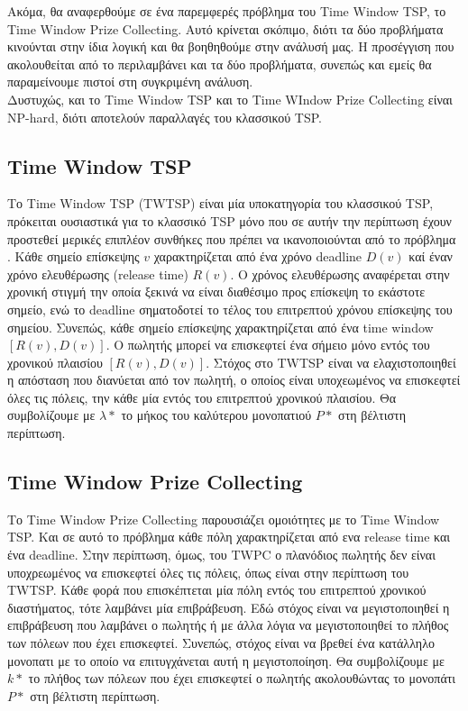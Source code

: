 \documentclass[oneside,12pt]{book}
\theoremstyle{definition}
\begin{document}
Ακόμα, θα αναφερθούμε σε ένα παρεμφερές πρόβλημα του Time Window TSP, το Time Window Prize Collecting. Αυτό κρίνεται σκόπιμο, διότι τα δύο προβλήματα κινούνται στην ίδια λογική και θα βοηθηθούμε στην ανάλυσή μας. Η προσέγγιση που ακολουθείται από το \cite{12} περιλαμβάνει και τα δύο προβλήματα, συνεπώς και εμείς θα παραμείνουμε πιστοί στη συγκριμένη ανάλυση. \\ 

Δυστυχώς, και το Time Window TSP και το Time WIndow Prize Collecting είναι NP-hard, διότι αποτελούν παραλλαγές του κλασσικού TSP. \\

\subsection{Time Window TSP} 

Το Time Window TSP (TWTSP) είναι μία υποκατηγορία του κλασσικού TSP, πρόκειται ουσιαστικά για το κλασσικό TSP μόνο που σε αυτήν την περίπτωση έχουν προστεθεί μερικές επιπλέον συνθήκες που πρέπει να ικανοποιούνται από το πρόβλημα . Κάθε σημείο επίσκεψης \(v\) χαρακτηρίζεται από ένα χρόνο deadline \(D(v)\) καί έναν χρόνο ελευθέρωσης (release time) \(R(v)\). Ο χρόνος ελευθέρωσης αναφέρεται στην χρονική στιγμή την οποία ξεκινά να είναι διαθέσιμο προς επίσκεψη το εκάστοτε σημείο, ενώ το deadline σηματοδοτεί το τέλος του επιτρεπτού χρόνου επίσκεψης του σημείου. Συνεπώς, κάθε σημείο επίσκεψης χαρακτηρίζεται από ένα time window \([R(v), D(v)]\). Ο πωλητής μπορεί να επισκεφτεί ένα σήμειο μόνο εντός του χρονικού πλαισίου \([R(v), D(v)]\). Στόχος στο TWTSP είναι να ελαχιστοποιηθεί η απόσταση που διανύεται από τον πωλητή, ο οποίος είναι υποχεωμένος να επισκεφτεί όλες τις πόλεις, την κάθε μία εντός του επιτρεπτού χρονικού πλαισίου. Θα συμβολίζουμε με \(λ*\) το μήκος του καλύτερου μονοπατιού \(P*\) στη βέλτιστη περίπτωση.  \\

\subsection{Time Window Prize Collecting}

Το Time Window Prize Collecting παρουσιάζει ομοιότητες με το Time Window TSP. Και σε αυτό το πρόβλημα κάθε πόλη χαρακτηρίζεται από ενα release time και ένα deadline. Στην περίπτωση, όμως, του TWPC ο πλανόδιος πωλητής δεν είναι υποχρεωμένος να επισκεφτεί όλες τις πόλεις, όπως είναι στην περίπτωση του TWTSP. Κάθε φορά που επισκέπτεται μία πόλη εντός του επιτρεπτού χρονικού διαστήματος, τότε λαμβάνει μία επιβράβευση. Εδώ στόχος είναι να μεγιστοποιηθεί η επιβράβευση που λαμβάνει ο πωλητής ή με άλλα λόγια να μεγιστοποιηθεί το πλήθος των πόλεων που έχει επισκεφτεί. Συνεπώς, στόχος είναι να βρεθεί ένα κατάλληλο μονοπατι με το οποίο να επιτυγχάνεται αυτή η μεγιστοποίηση. Θα συμβολίζουμε με \(k*\) το πλήθος των πόλεων που έχει επισκεφτεί ο πωλητής ακολουθώντας το μονοπάτι \(P*\) στη βέλτιστη περίπτωση. \\  
\end{document}
